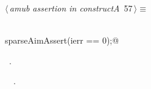 \documentclass{article}
\begin{document}
\begin{flushleft} \small
\begin{minipage}{\linewidth}\label{scrap85}\raggedright\small
{} $\langle\,${\itshape amub assertion in constructA}\nobreak\ {\footnotesize {57}}$\,\rangle\equiv$
\vspace{-1ex}
\begin{list}{}{} \item
\mbox{}\verb@@\\
\mbox{}\verb@      sparseAimAssert(ierr == 0);@\\
\mbox{}\verb@@{\NWsep}
\end{list}
\vspace{-1.5ex}
\footnotesize
\begin{list}{}{\setlength{\itemsep}{-\parsep}\setlength{\itemindent}{-\leftmargin}}
\item \NWtxtMacroRefIn\ .
\item \NWtxtIdentsUsed\nobreak\  \verb@ierr@\nobreak\ .
\item{}
\end{list}
\end{minipage}\vspace{4ex}
\end{flushleft}
\end{document}

